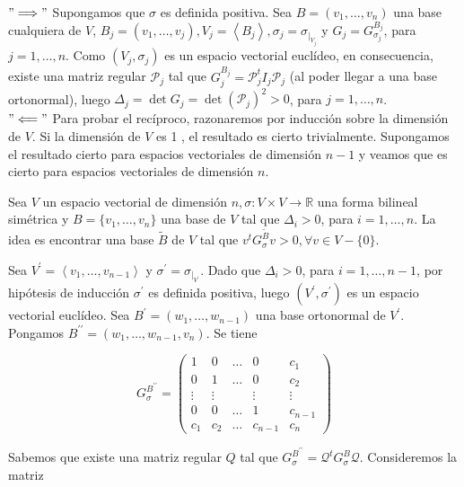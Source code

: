 \documentclass[12pt, a4paper, ones, notitlepage, openany,titlepage]{article}
\begin{document}
\textbf{$"\Longrightarrow"$}	Supongamos que $\sigma$ es definida positiva. Sea $B=\left(v_{1}, \ldots, v_{n}\right)$ una base cualquiera de $V$, $B_{j}=\left(v_{1}, \ldots, v_{j}\right), V_{j}=\left\langle B_{j}\right\rangle, \sigma_{j}=\sigma_{\left.\right|_{V_j}}$ y $G_{j}=G_{\sigma_{j}}^{B_{j}}$, para $j=1, \ldots, n$.
Como $\left(V_{j}, \sigma_{j}\right)$ es un espacio vectorial euclídeo, en consecuencia, existe una matriz regular $\mathcal{P}_{j}$ tal que $G_{j}^{B_{j}}=\mathcal{P}_{j}^{t} I_{j} \mathcal{P}_{j}$ (al poder llegar a una base ortonormal), luego $\Delta_{j}=\operatorname{det} G_{j}=\operatorname{det}\left(\mathcal{P}_{j}\right)^{2}>0$, para $j=1, \ldots, n$.\\

\textbf{$"\Longleftarrow"$}	Para probar el recíproco, razonaremos por inducción sobre la dimensión de $V$. Si la dimensión de $V$ es 1 , el resultado es cierto trivialmente. Supongamos el resultado cierto para espacios vectoriales de dimensión $n-1$ y veamos que es cierto para espacios vectoriales de dimensión $n$.

Sea $V$ un espacio vectorial de dimensión $n, \sigma: V \times V \rightarrow \mathbb{R}$ una forma bilineal simétrica y $B=\{v_{1}, \ldots, v_{n}\}$ una base de $V$ tal que $\Delta_{i}>0$, para $i=1, \ldots, n$. La idea es encontrar una base $\widetilde{B}$ de $V$ tal que $v^t G_\sigma^{\widetilde{B}} v > 0, \forall v \in V - \{0\}$.

Sea $V^{\prime}=\left\langle v_{1}, \ldots, v_{n-1}\right\rangle$ y $\sigma^{\prime}=\sigma_{\left.\right|_{V^{\prime}}}$. Dado que $\Delta_{i}>0$, para $i=1, \ldots, n-1$, por hipótesis de inducción $\sigma^{\prime}$ es definida positiva, luego $\left(V^{\prime}, \sigma^{\prime}\right)$ es un espacio vectorial euclídeo. Sea $B^{\prime}=\left(w_{1}, \ldots, w_{n-1}\right)$ una base ortonormal de $V^{\prime}$. Pongamos $B^{\prime \prime}=\left(w_{1}, \ldots, w_{n-1}, v_{n}\right)$. Se tiene

$$
G_{\sigma}^{B^{\prime \prime}}=\left(\begin{array}{ccccc}
	1 & 0 & \ldots & 0 & c_{1} \\
	0 & 1 & \ldots & 0 & c_{2} \\
	\vdots & \vdots & & \vdots & \vdots \\
	0 & 0 & \ldots & 1 & c_{n-1} \\
	c_{1} & c_{2} & \ldots & c_{n-1} & c_{n}
\end{array}\right)
$$

Sabemos que existe una matriz regular $Q$ tal que $G_{\sigma}^{B^{\prime \prime}}=\mathcal{Q}^{t} G_{\sigma}^{B} \mathcal{Q}$. Consideremos la matriz
\end{document}

